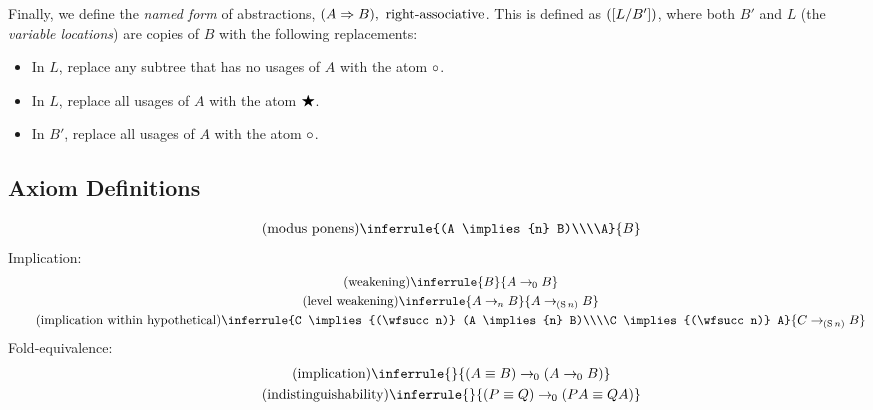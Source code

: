 \documentclass{article}
\begin{document}
  Finally, we define the \emph{named form} of abstractions, $(A \Rightarrow B),\ \operatorname{right-associative}$.
  This is defined as $([L/B'])$, where both $B'$ and $L$ (the \emph{variable locations}) are copies of $B$ with the following replacements:
  \begin{itemize}
    \item In $L$, replace any subtree that has no usages of $A$ with the atom $\circ$.
    \item In $L$, replace all usages of $A$ with the atom $\bigstar$.
    \item In $B'$, replace all usages of $A$ with the atom $\circ$.
  \end{itemize}

  \subsection{Axiom Definitions}
  \setlength{\jot}{1.4em}
  \begin{gather*}
    \tag{modus ponens}\label{mp}
    \inferrule{(A \implies{n} B)\\\\A}{B}\\
  \end{gather*}
  Implication:
  \begin{gather*}
    \tag{weakening}
    \inferrule{B}{A \implies{\wfz} B}\\
    \tag{level weakening}
    \inferrule{A \implies{n} B}{A \implies{(\wfsucc n)} B}\\
    \tag{implication within hypothetical}
    \inferrule{C \implies{(\wfsucc n)} (A \implies{n} B)\\\\C \implies{(\wfsucc n)} A}{C \implies{(\wfsucc n)} B}\\
  \end{gather*}
  Fold-equivalence:
  \begin{gather*}
    \tag{implication}
    \inferrule{}{(A \equiv B) \implies{\wfz} (A \implies{\wfz} B)}\\
    \tag{indistinguishability}
    \inferrule{}{(P \equiv Q) \implies{\wfz} (PA \equiv QA)}\\
  \end{gather*}
\end{document}
